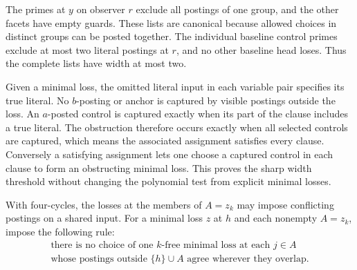 The primes at $y$ on observer $r$ exclude all
postings of one group, and the other facets have
empty guards. These lists are canonical because
allowed choices in distinct groups can be posted
together. The individual baseline control primes
exclude at most two literal postings at $r$,
and no other baseline head loses. Thus the
complete lists have width at most two.

Given a minimal loss, the omitted literal
input in each variable pair specifies its true
literal. No $b$-posting or anchor is captured
by visible postings outside the loss. An
$a$-posted control is captured exactly when
its part of the clause includes a true literal.
The obstruction therefore occurs exactly when
all selected controls are captured, which means
the associated assignment satisfies every
clause. Conversely a satisfying assignment lets
one choose a captured control in each clause to
form an obstructing minimal loss. This proves
the sharp width threshold without changing the
polynomial test from explicit minimal losses.

With four-cycles, the losses at the members of $A=z_k$ may impose
conflicting postings on a shared input. For a minimal loss $z$ at
$h$ and each nonempty $A=z_k$, impose the following rule:
\begin{equation}\label{core:eq:compatible-facet-losses}
 \begin{gathered}
 \text{there is no choice of one $k$-free minimal loss at each
 $j\in A$}\\
 \text{whose postings outside $\{h\}\cup A$ agree wherever they overlap.}
 \end{gathered}
\end{equation}

